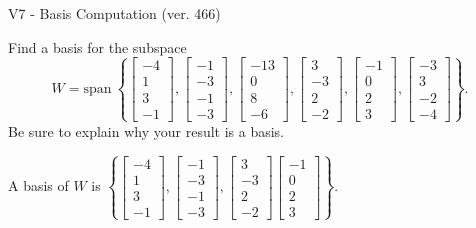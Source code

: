 \begin{exercise}
  \begin{exerciseTitle}V7 - Basis Computation (ver. 466)\end{exerciseTitle}
  \begin{exerciseStatement}
    Find a basis for the subspace 
\[W=\mathrm{span}\ \left\{\left[\begin{array}{r}
-4 \\
1 \\
3 \\
-1
\end{array}\right] , \left[\begin{array}{r}
-1 \\
-3 \\
-1 \\
-3
\end{array}\right] , \left[\begin{array}{r}
-13 \\
0 \\
8 \\
-6
\end{array}\right] , \left[\begin{array}{r}
3 \\
-3 \\
2 \\
-2
\end{array}\right] , \left[\begin{array}{r}
-1 \\
0 \\
2 \\
3
\end{array}\right] , \left[\begin{array}{r}
-3 \\
3 \\
-2 \\
-4
\end{array}\right]\right\}.\]
 Be sure to explain why your result is a basis.


  \end{exerciseStatement}
  \begin{exerciseAnswer}
   A basis of \(W\) is  \(\left\{\left[\begin{array}{r}
-4 \\
1 \\
3 \\
-1
\end{array}\right] , \left[\begin{array}{r}
-1 \\
-3 \\
-1 \\
-3
\end{array}\right] , \left[\begin{array}{r}
3 \\
-3 \\
2 \\
-2
\end{array}\right] \left[\begin{array}{r}
-1 \\
0 \\
2 \\
3
\end{array}\right]\right\}\).
  


  \end{exerciseAnswer}
\end{exercise}